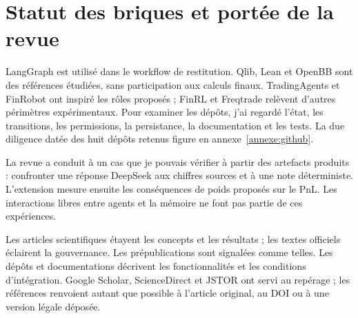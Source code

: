 \section{Statut des briques et portée de la revue}

LangGraph est utilisé dans le workflow de restitution. Qlib, Lean et OpenBB sont des références étudiées, sans participation aux calculs finaux. TradingAgents et FinRobot ont inspiré les rôles proposés ; FinRL et Freqtrade relèvent d'autres périmètres expérimentaux. Pour examiner les dépôts, j'ai regardé l'état, les transitions, les permissions, la persistance, la documentation et les tests. La due diligence datée des huit dépôts retenus figure en annexe~\ref{annexe:github}.

La revue a conduit à un cas que je pouvais vérifier à partir des artefacts produits : confronter une réponse DeepSeek aux chiffres sources et à une note déterministe. L'extension mesure ensuite les conséquences de poids proposés sur le PnL. Les interactions libres entre agents et la mémoire ne font pas partie de ces expériences.

Les articles scientifiques étayent les concepts et les résultats ; les textes officiels éclairent la gouvernance. Les prépublications sont signalées comme telles. Les dépôts et documentations décrivent les fonctionnalités et les conditions d'intégration. Google Scholar, ScienceDirect et JSTOR ont servi au repérage ; les références renvoient autant que possible à l'article original, au DOI ou à une version légale déposée.
